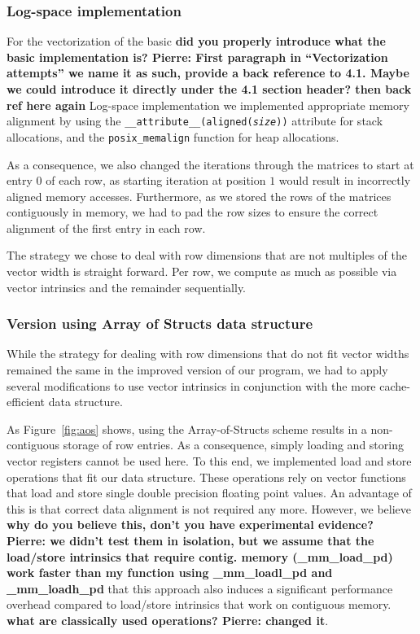 \documentclass[runningheads,a4paper]{llncs}
\begin{document}
\subsubsection{Log-space implementation}
For the vectorization of the basic {\bf did you properly introduce what the basic implementation is? Pierre: First paragraph in ``Vectorization attempts'' we name it as such, provide a back reference to 4.1. Maybe we could introduce it directly under the 4.1 section header? then back ref here again} 
Log-space implementation we implemented appropriate memory alignment by using the \texttt{\_\_attribute\_\_(aligned(\textit{size}))} attribute for stack allocations, 
and the \texttt{posix\_memalign} function for heap allocations.

As a consequence, we also changed the iterations through the matrices to start at entry $0$ of each row, as starting iteration at position $1$ would result in incorrectly aligned memory accesses. 
Furthermore, as we stored the rows of the matrices contiguously in memory, we had to pad the row sizes 
to ensure the correct alignment of the first entry in each row.

The strategy we chose to deal with row dimensions that are not multiples of the vector width is straight forward. 
Per row, we compute as much as possible via vector intrinsics and the remainder sequentially. 

\subsubsection{Version using Array of Structs data structure}
While the strategy for dealing with row dimensions that do not fit vector widths remained the same in the improved version of our program, 
we had to apply several modifications to use vector intrinsics in conjunction with the more cache-efficient data structure.

As Figure~\ref{fig:aos} shows, using the Array-of-Structs scheme results in a non-contiguous storage of row entries. 
As a consequence, simply loading and storing vector registers cannot be used here. 
To this end, we implemented load and store operations that fit our data structure. These operations rely on vector functions that load and store single double precision floating point values. 
An advantage of this is that correct data alignment is not required any more. 
However, we believe {\bf why do you believe this, don't you have experimental evidence? Pierre: we didn't test them in isolation, but we assume that the load/store intrinsics that require contig. memory (\_mm\_load\_pd) work faster than my function using \_mm\_loadl\_pd and \_mm\_loadh\_pd} that this approach also induces a significant performance overhead 
compared to load/store intrinsics that work on contiguous memory. {\bf what are classically used operations? Pierre: changed it}.
\end{document}
